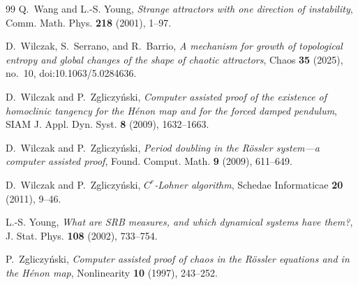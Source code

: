 \documentclass[11pt]{amsart}
\theoremstyle{definition}
\theoremstyle{remark}
\begin{document}
\begin{thebibliography}{99}
Q.~Wang and L.-S. Young,
\emph{Strange attractors with one direction of instability},
Comm. Math. Phys. \textbf{218} (2001), 1--97.

D.~Wilczak, S.~Serrano, and R.~Barrio,
\emph{A mechanism for growth of topological entropy and global changes of the shape of chaotic attractors},
Chaos \textbf{35} (2025), no.~10, doi:10.1063/5.0284636.

D.~Wilczak and P.~Zgliczy\'nski,
\emph{Computer assisted proof of the existence of homoclinic tangency for the H\'enon map and for the forced
damped pendulum},
SIAM J. Appl. Dyn. Syst. \textbf{8} (2009), 1632--1663.

D.~Wilczak and P.~Zgliczy\'nski,
\emph{Period doubling in the R\"ossler system---a computer assisted proof},
Found. Comput. Math. \textbf{9} (2009), 611--649.

D.~Wilczak and P.~Zgliczy\'nski,
\emph{$C^r$-Lohner algorithm},
Schedae Informaticae \textbf{20} (2011), 9--46.

L.-S. Young,
\emph{What are SRB measures, and which dynamical systems have them?},
J. Stat. Phys. \textbf{108} (2002), 733--754.

P.~Zgliczy\'nski,
\emph{Computer assisted proof of chaos in the R\"ossler equations and in the H\'enon map},
Nonlinearity \textbf{10} (1997), 243--252.

\end{thebibliography}
\end{document}
